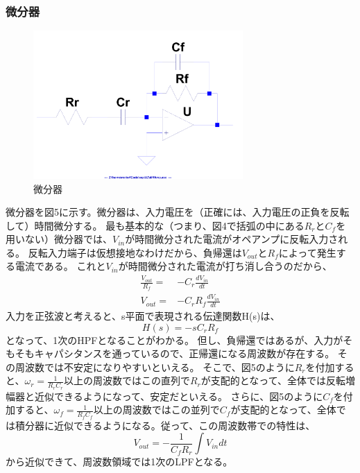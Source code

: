 \documentclass[10pt,a4j,dvipdfmx]{jsarticle}
\begin{document}
\subsubsection{微分器}
\begin{figure}[H]
  \centering
  \includegraphics[width=8cm, angle=270]{diffAmp.pdf}
  \caption{微分器}
\end{figure}
微分器を図5に示す。微分器は、入力電圧を（正確には、入力電圧の正負を反転して）時間微分する。
最も基本的な（つまり、図4で括弧の中にある$R_r$と$C_f$を用いない）微分器では、$V_{in}$が時間微分された電流がオペアンプに反転入力される。
反転入力端子は仮想接地なわけだから、負帰還は$V_{out}$と$R_f$によって発生する電流である。
これと$V_{in}$が時間微分された電流が打ち消し合うのだから、
\begin{align}
\frac{V_{out}}{R_f} =& -C_r\frac{dV_{in}}{dt} \\
V_{out} =& -C_rR_f\frac{dV_{in}}{dt}
\end{align}
入力を正弦波と考えると、s平面で表現される伝達関数H(s)は、
\begin{equation}
H(s) = -sC_rR_f
\end{equation}
となって、1次のHPFとなることがわかる。
但し、負帰還ではあるが、入力がそもそもキャパシタンスを通っているので、正帰還になる周波数が存在する。
その周波数では不安定になりやすいといえる。
そこで、図5のように$R_r$を付加すると、$\omega_r = \frac{1}{R_rC_r}$以上の周波数ではこの直列で$R_r$が支配的となって、全体では反転増幅器と近似できるようになって、安定だといえる。
さらに、図5のように$C_f$を付加すると、$\omega_f = \frac{1}{R_fC_f}$以上の周波数ではこの並列で$C_f$が支配的となって、全体では積分器に近似できるようになる。従って、この周波数帯での特性は、
\begin{equation}
V_{out} = -\frac{1}{C_fR_r}\int V_{in}dt
\end{equation}
から近似できて、周波数領域では1次のLPFとなる。
\end{document}
